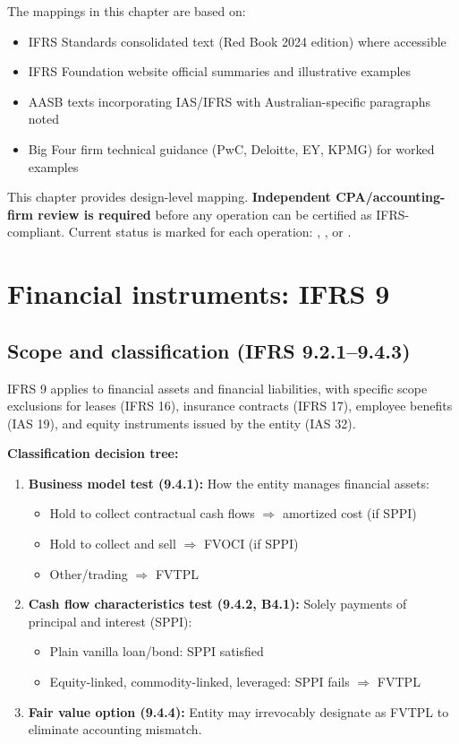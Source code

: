 The mappings in this chapter are based on:
\begin{itemize}
\item IFRS Standards consolidated text (Red Book 2024 edition) where accessible
\item IFRS Foundation website official summaries and illustrative examples
\item AASB texts incorporating IAS/IFRS with Australian-specific paragraphs noted
\item Big Four firm technical guidance (PwC, Deloitte, EY, KPMG) for worked examples
\end{itemize}

 This chapter provides design-level
mapping. \textbf{Independent CPA/accounting-firm review is required} before any
operation can be certified as IFRS-compliant. Current status is marked for each
operation: , , or .

\section{Financial instruments: IFRS 9}

\subsection{Scope and classification (IFRS 9.2.1--9.4.3)}

IFRS 9 applies to financial assets and financial liabilities, with specific scope
exclusions for leases (IFRS 16), insurance contracts (IFRS 17), employee benefits
(IAS 19), and equity instruments issued by the entity (IAS 32).

\textbf{Classification decision tree:}

\begin{enumerate}
\item \textbf{Business model test (9.4.1):} How the entity manages financial assets:
  \begin{itemize}
  \item Hold to collect contractual cash flows $\Rightarrow$ amortized cost (if SPPI)
  \item Hold to collect and sell $\Rightarrow$ FVOCI (if SPPI)
  \item Other/trading $\Rightarrow$ FVTPL
  \end{itemize}
\item \textbf{Cash flow characteristics test (9.4.2, B4.1):} Solely payments of
  principal and interest (SPPI):
  \begin{itemize}
  \item Plain vanilla loan/bond: SPPI satisfied
  \item Equity-linked, commodity-linked, leveraged: SPPI fails $\Rightarrow$ FVTPL
  \end{itemize}
\item \textbf{Fair value option (9.4.4):} Entity may irrevocably designate as FVTPL
  to eliminate accounting mismatch.
\end{enumerate}

